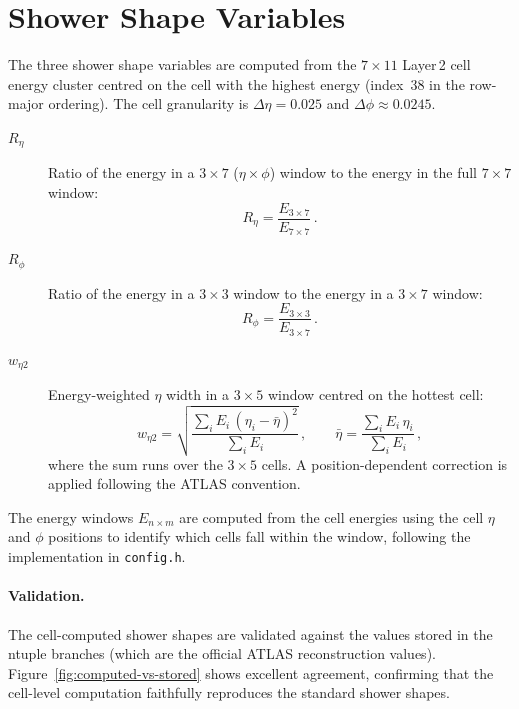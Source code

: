 \documentclass[11pt,a4paper]{article}
\newcommand{\Reta}{\ensuremath{R_{\eta}}}
\newcommand{\Rphi}{\ensuremath{R_{\phi}}}
\newcommand{\weta}{\ensuremath{w_{\eta 2}}}
\begin{document}
\section{Shower Shape Variables}
\label{sec:shower-shapes}

The three shower shape variables are computed from the $7 \times 11$
Layer\,2 cell energy cluster centred on the cell with the highest energy
(index~38 in the row-major ordering).  The cell granularity is
$\Delta\eta = 0.025$ and $\Delta\phi \approx 0.0245$.

\begin{description}
  \item[\Reta] Ratio of the energy in a $3 \times 7$ ($\eta \times \phi$)
    window to the energy in the full $7 \times 7$ window:
    \begin{equation}
      \Reta = \frac{E_{3 \times 7}}{E_{7 \times 7}} \,.
    \end{equation}

  \item[\Rphi] Ratio of the energy in a $3 \times 3$ window to the energy
    in a $3 \times 7$ window:
    \begin{equation}
      \Rphi = \frac{E_{3 \times 3}}{E_{3 \times 7}} \,.
    \end{equation}

  \item[\weta] Energy-weighted $\eta$ width in a $3 \times 5$ window
    centred on the hottest cell:
    \begin{equation}
      \weta = \sqrt{\frac{\sum_i E_i \, (\eta_i - \bar\eta)^2}{\sum_i E_i}}
      \,,\qquad
      \bar\eta = \frac{\sum_i E_i \, \eta_i}{\sum_i E_i} \,,
    \end{equation}
    where the sum runs over the $3 \times 5$ cells.  A position-dependent
    correction is applied following the ATLAS convention.
\end{description}

The energy windows $E_{n \times m}$ are computed from the cell energies
using the cell $\eta$ and $\phi$ positions to identify which cells fall
within the window, following the implementation in \texttt{config.h}.

\paragraph{Validation.}
The cell-computed shower shapes are validated against the values stored
in the ntuple branches (which are the official ATLAS reconstruction
values).  Figure~\ref{fig:computed-vs-stored} shows excellent agreement,
confirming that the cell-level computation faithfully reproduces the
standard shower shapes.
\end{document}
